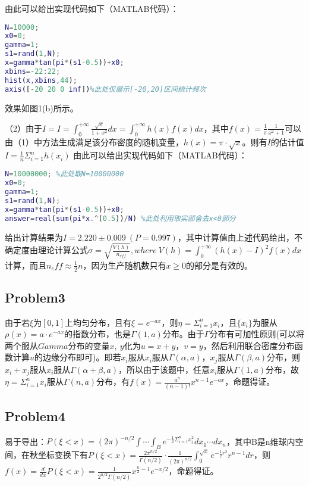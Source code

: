 \documentclass{article}
\begin{document}
由此可以给出实现代码如下（MATLAB代码）：
\begin{lstlisting}[language=MATLAB]
N=10000;
x0=0;
gamma=1;
s1=rand(1,N);
x=gamma*tan(pi*(s1-0.5))+x0;
xbins=-22:22;
hist(x,xbins,44);
axis([-20 20 0 inf])%此处仅展示[-20,20]区间统计频次
\end{lstlisting}
效果如图1(b)所示。

（2）由于$I=I = \int _ { 0 } ^ { + \infty } \frac { \sqrt { x } } { 1 + x ^ { 2 } } d x  =\int_0^{+\infty}h(x)f(x)dx$，其中$f(x)=\frac { 1 } { \pi } \frac { 1 } { x^ { 2 } +1 }$可以由（1）中方法生成满足该分布密度的随机变量，$h(x)=\pi\cdot\sqrt{x}$。则有$I$的估计值$I=\frac{1}{n}\Sigma_{i=1}^n h(x_i)$
由此可以给出实现代码如下（MATLAB代码）：
\begin{lstlisting}[language=MATLAB]
N=10000000; %此处取N=10000000
x0=0;
gamma=1;
s1=rand(1,N);
x=gamma*tan(pi*(s1-0.5))+x0;
answer=real(sum(pi*x.^(0.5))/N) %此处利用取实部舍去x<0部分
\end{lstlisting}
给出计算结果为$I=2.220\pm0.009\ (P=0.997)$，其中计算值由上述代码给出，不确定度由理论计算公式$\sigma=\sqrt{\frac{V(h)}{n_{eff}}},where\ V ( h ) = \int _ { 0 } ^ { +\infty } ( h(x) - I ) ^ { 2 } f ( x ) d x  $计算，而且$n_eff\approx\frac{1}{2}n$，因为生产随机数只有$x\geq0$的部分是有效的。
\subsection{Problem3}
由于若$\xi$为$[0,1]$上均匀分布，且有$\xi=e^{-ax}$，则$\eta=\Sigma_{i=1}^{n}x_i$，且$\{x_i\}$为服从$\rho(x)=a\cdot e^{-ax}$的指数分布，也是$\Gamma(1,a)$分布。由于$\Gamma$分布有可加性原则(可以将两个服从$Gamma$分布的变量$x,\ y$化为$u=x+y$，$v=y$，然后利用联合密度分布函数计算$u$的边缘分布即可)。即若$x_i$服从$x_i$服从$\Gamma(\alpha,a)$，$x_j$服从$\Gamma(\beta,a)$分布，则$x_i+x_j$服从$x_i$服从$\Gamma(\alpha+\beta,a)$，所以由于该题中，任意$x_i$服从$\Gamma(1,a)$分布，故$\eta=\Sigma_{i=1}^{n}x_i$服从$\Gamma(n,a)$分布，有$f ( x )  = \frac { a ^ { n } } { ( n - 1 ) ! } x ^ { n - 1 } e ^ { - a x }   $，命题得证。
\subsection{Problem4}
易于导出：$P(\xi<x)=(2\pi)^{-n/2}\int\cdots\int_B e^{-\frac{1}{2}\Sigma_{i=1}^{n}x_i^2}dx_1\cdots dx_n$，其中B是n维球内空间，在秋坐标变换下有$P(\xi<x)=\frac{2\pi^{n/2}}{\Gamma(n/2)}\cdot\frac{1}{(2\pi)^{n/2}}\int_0^{\sqrt{x}}e^{-\frac{1}{2}r^2}r^{n-1}dr$，则$f(x)=\frac{d}{dx}P(\xi<x)= \frac{1}{2^{n/2}\Gamma(n/2)}x^{\frac{n}{2}-1}e^{-x/2}$，命题得证。
\end{document}
